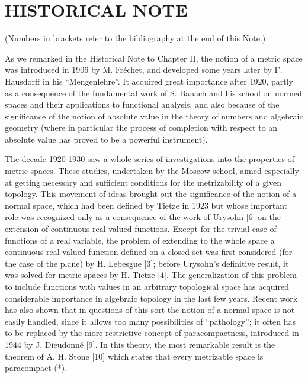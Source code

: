 \section*{HISTORICAL NOTE}
{}

(Numbers in brackets refer to the bibliography at the end of this Note.)

As we remarked in the Historical Note to Chapter II, the notion of a metric space was introduced in 1906 by M. Fréchet, and developed some years later by F. Hausdorff in his ``Mengenlehre''. It acquired great importance after 1920, partly as a consequence of the fundamental work of S. Banach and his school on normed spaces and their applications to functional analysis, and also because of the significance of the notion of absolute value in the theory of numbers and algebraic geometry (where in particular the process of completion with respect to an absolute value has proved to be a powerful instrument).

The decade 1920-1930 saw a whole series of investigations into the properties of metric spaces. These studies, undertaken by the Moscow school, aimed especially at getting necessary and sufficient conditions for the metrizability of a given topology. This movement of ideas brought out the significance of the notion of a normal space, which had been defined by Tietze in 1923 but whose important role was recognized only as a consequence of the work of Urysohn {[}6{]} on the extension of continuous real-valued functions. Except for the trivial case of functions of a real variable, the problem of extending to the whole space a continuous real-valued function defined on a closed set was first considered (for the case of the plane) by H. Lebesgue {[}3{]}; before Urysohn's definitive result, it was solved for metric spaces by H. Tietze {[}4{]}. The generalization of this problem to include functions with values in an arbitrary topological space has acquired considerable importance in algebraic topology in the last few years. Recent work has also shown that in questions of this sort the notion of a normal space is not easily handled, since it allows too many possibilities of ``pathology''; it often has to be replaced by the more restrictive concept of paracompactness, introduced in 1944 by J. Dieudonné {[}9{]}. In this theory, the most remarkable result is the theorem of A. H. Stone {[}10{]} which states that every metrizable space is paracompact (*).

